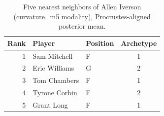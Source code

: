 \begin{table}[htbp]
  \centering\small
  \begin{tabular}{rllc}
    \toprule
    Rank & Player & Position & Archetype \\
    \midrule
    1 & Sam Mitchell & F & 1 \\
    2 & Eric Williams & G & 2 \\
    3 & Tom Chambers & F & 1 \\
    4 & Tyrone Corbin & F & 2 \\
    5 & Grant Long & F & 1 \\
    \bottomrule
  \end{tabular}
  \caption{Five nearest neighbors of Allen Iverson (curvature_m5 modality), Procrustes-aligned posterior mean.}
  \label{tab:Allen_Iverson_neighbors_curvature_m5}
\end{table}

